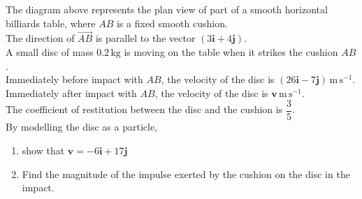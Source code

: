 \documentclass[leqno]{article}
\begin{document}
\begin{enumerate}[
  label=\textbf{\arabic*.},
  leftmargin=*,
  topsep=0pt,
  partopsep=0pt,
  parsep=0pt
]
\begin{figure}[H]
\end{figure}


The diagram above represents the plan view of part of a smooth horizontal billiards table, where $AB$ is a fixed smooth cushion. \\

The direction of $\overrightarrow{AB}$ is parallel to the vector $(3\mathbf{i}+4\mathbf{j})$. \\

A small disc of mass $0.2\,\mathrm{kg}$ is moving on the table when it strikes the cushion $AB$. \\

Immediately before impact with $AB$, the velocity of the disc is $(26\mathbf{i}-7\mathbf{j})\,\mathrm{m\,s^{-1}}$. \\

Immediately after impact with $AB$, the velocity of the disc is $\mathbf{v}\,\mathrm{m\,s^{-1}}$. \\

The coefficient of restitution between the disc and the cushion is $\dfrac{3}{5}$. \\

By modelling the disc as a particle, \\

\begin{enumerate}[label=\textbf{(\alph*)}]
  \item show that $\mathbf{v}=-6\mathbf{i}+17\mathbf{j}$  \\
  \item Find the magnitude of the impulse exerted by the cushion on the disc in the impact.  \\
\end{enumerate}
\newpage


\end{enumerate}
\end{document}

